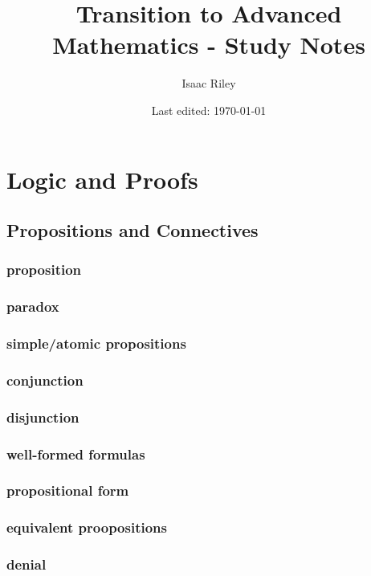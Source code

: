 \documentclass[a4paper]{article}
\title{Transition to Advanced Mathematics - Study Notes}
\author{Isaac Riley}
\date{Last edited: \today}
\begin{document}
\maketitle
\tableofcontents
\newpage





\section{Logic and Proofs}   %
\subsection{Propositions and Connectives}   %
\subsubsection*{proposition}
\subsubsection*{paradox}
\subsubsection*{simple/atomic propositions}
\subsubsection*{conjunction}
\subsubsection*{disjunction}
\subsubsection*{well-formed formulas}
\subsubsection*{propositional form}
\subsubsection*{equivalent proopositions}
\subsubsection*{denial}
\end{document}
